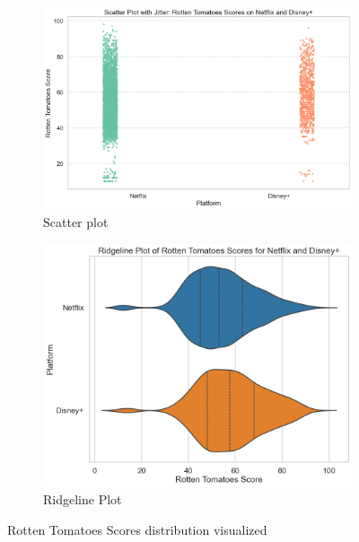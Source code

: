 \documentclass[a4paper, 12pt]{article}
\begin{document}
\begin{figure}[H]
    \centering
    \begin{subfigure}[t]{0.48\textwidth}
        \centering
        \includegraphics[width=\textwidth]{scatter.png}
        \caption{Scatter plot}
        \label{fig:scatter}
    \end{subfigure}
    \begin{subfigure}[t]{0.48\textwidth}
        \centering
        \includegraphics[width=\textwidth]{ridgeline.png}
        \caption{Ridgeline Plot}
        \label{fig:ridgeline}
    \end{subfigure}
        \caption{Rotten Tomatoes Scores distribution visualized}
    \label{fig:rig_scatter_plots}
\end{figure}
\end{document}
